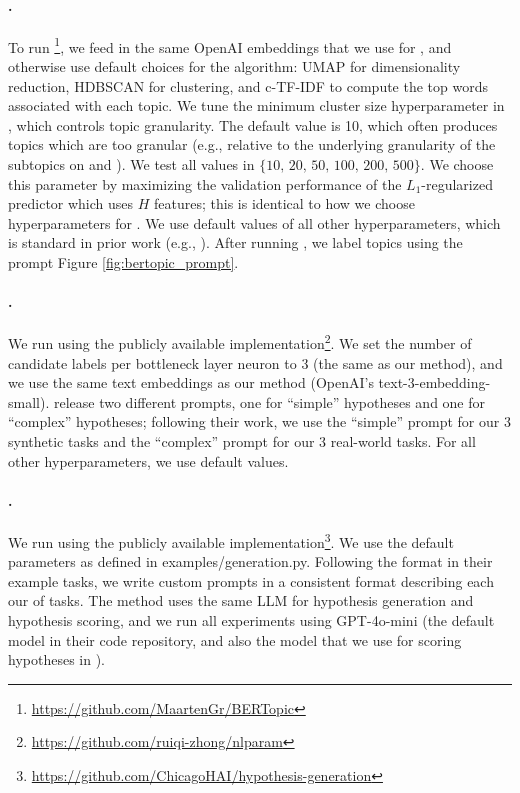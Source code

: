 \paragraph{\bertopic \citep{grootendorst_bertopic_2022}.}
To run \bertopic\footnote{\href{https://github.com/MaartenGr/BERTopic}{https://github.com/MaartenGr/BERTopic}}, we feed in the same OpenAI  embeddings that we use for \ourmethod, and otherwise use default choices for the algorithm: UMAP for dimensionality reduction, HDBSCAN for clustering, and c-TF-IDF to compute the top words associated with each topic.
We tune the minimum cluster size hyperparameter in \bertopic, which controls topic granularity. 
The default value is 10, which often produces topics which are too granular (e.g., relative to the underlying granularity of the subtopics on \wiki and \bills). 
We test all values in $\{\text{10, 20, 50, 100, 200, 500}\}$. 
We choose this parameter by maximizing the validation performance of the $L_1$-regularized predictor which uses $H$ features; this is identical to how we choose hyperparameters for \ourmethod.
We use default values of all other hyperparameters, which is standard in prior work (e.g., \citet{pham_topicgpt_2024}). 
After running \bertopic, we label topics using the prompt Figure \ref{fig:bertopic_prompt}.

\paragraph{\nlparam \citep{zhong_explaining_2024}.} 
We run \nlparam using the publicly available implementation\footnote{\href{https://github.com/ruiqi-zhong/nlparam}{https://github.com/ruiqi-zhong/nlparam}}. 
We set the number of candidate labels per bottleneck layer neuron to 3 (the same as our method), and we use the same text embeddings as our method (OpenAI's text-3-embedding-small).
\citet{zhong_explaining_2024} release two different prompts, one for ``simple'' hypotheses and one for ``complex'' hypotheses; following their work, we use the ``simple'' prompt for our 3 synthetic tasks and the ``complex'' prompt for our 3 real-world tasks.
For all other hyperparameters, we use default values.

\paragraph{\hypogenic \citep{zhou_hypothesis_2024}.} We run \hypogenic using the publicly available implementation\footnote{\href{https://github.com/ChicagoHAI/hypothesis-generation}{https://github.com/ChicagoHAI/hypothesis-generation}}. 
We use the default parameters as defined in examples/generation.py. Following the format in their example tasks, we write custom prompts in a consistent format describing each our of tasks. 
The method uses the same LLM for hypothesis generation and hypothesis scoring, and we run all experiments using GPT-4o-mini (the default model in their code repository, and also the model that we use for scoring hypotheses in \ourmethod).




